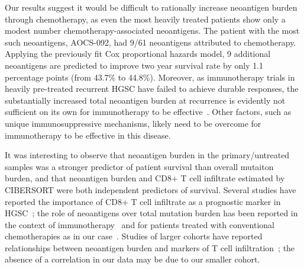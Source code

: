 \documentclass[linenumbers]{bmcart}
\begin{document}


Our results suggest it would be difficult to rationally increase neoantigen burden through chemotherapy, as even the most heavily treated patients show only a modest number chemotherapy-associated neoantigens. The patient with the most such neoantigens, AOCS-092, had 9/61 neoantigens attributed to chemotherapy. Applying the previously fit Cox proportional hazards model, 9 additional neoantigens are predicted to improve two year survival rate by only 1.1 percentage points (from 43.7\% to 44.8\%). Moreover, as immunotherapy trials in heavily pre-treated recurrent HGSC have failed to achieve durable responses, the substantially increased total neoantigen burden at recurrence is evidently not sufficient on its own for immunotherapy to be effective~\cite{Drerup2015}. Other factors, such as unique immunosuppressive mechanisms, likely need to be overcome for immunotherapy to be effective in this disease.

It was interesting to observe that neoantigen burden in the primary/untreated samples was a stronger predictor of patient survival than overall mutaiton burden, and that neoantigen burden and CD8+ T cell infiltrate estimated by CIBERSORT were both independent predictors of survival. Several studies have reported the importance of CD8+ T cell infiltrate as a prognostic marker in HGSC~\cite{Sato2005,Hamanishi2007}; the role of neoantigens over total mutation burden has been reported in the context of immunotherapy~\cite{Van_Allen_2015,Rizvi_2015} and for patients treated with conventional chemotherapies as in our case~\cite{Brown_2014}. Studies of larger cohorts have reported relationships between neoantigen burden and markers of T cell infiltration~\cite{Rooney_2015,Giannakis2016}; the absence of a correlation in our data may be due to our smaller cohort.
\end{document}
